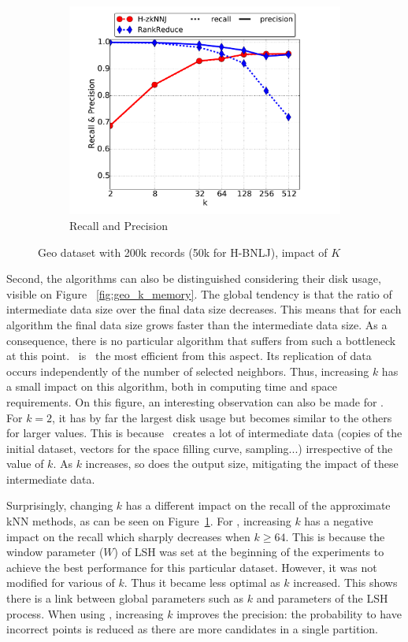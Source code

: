\begin{figure}[htp]
\begin{subfigure}[b]{0.35\textwidth}
		\includegraphics[width=\textwidth]{img-perf/geo/k/accuracy.pdf} 
		\caption{Recall and Precision \label{fig:geo_k_acc}}            
	\end{subfigure}%
	\caption{ Geo dataset with 200k records (50k for H-BNLJ), impact of $K$  }
	\label{fig:geo_impact_k}
\end{figure}

Second, the algorithms can also be distinguished considering their disk usage, visible on 
Figure ~\ref{fig:geo_k_memory}. The global tendency is that the ratio of intermediate data size over the final data 
size decreases. This means that for each algorithm the final 
data size grows faster than the intermediate data size. As a consequence, there is no particular algorithm that 
suffers from such a bottleneck at this point.
\VO~is \ the most efficient from this aspect. Its replication of data occurs independently of the number of 
selected neighbors. Thus, increasing $k$ has a small impact on this algorithm, both in computing time and space 
requirements. On this figure, an interesting observation can also be made for \Z. For $k=2$, it has by far the 
largest disk
usage but becomes similar to the others for larger values. 
This is because \Z~creates a lot of intermediate data (copies of the initial dataset, vectors for the space 
filling curve, sampling...) irrespective of the value of $k$. As $k$ increases, so does the output size, mitigating the 
impact of these intermediate data. 

Surprisingly, changing $k$ has a different impact on the recall of the approximate kNN methods, as can be seen on 
Figure~\ref{fig:geo_k_acc}.
For \LSH, increasing $k$ has a negative impact on the recall which sharply decreases when $k\geq 64$. This is
because the window parameter ($W$) of LSH was set at the beginning of the experiments to achieve the best performance for this
particular dataset. However, it was not modified for various of $k$. Thus it became less optimal as $k$ increased. This 
shows there is a link between global parameters such 
as $k$ and parameters of the LSH process. When using \Z, 
increasing $k$  improves the precision: the probability to have incorrect points is reduced as there are more 
candidates in a single partition. 

